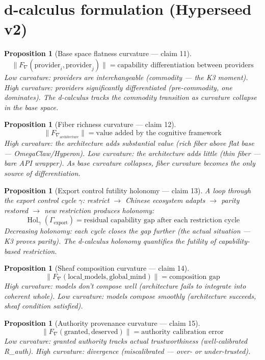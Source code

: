 \documentclass[11pt,a4paper]{article}
\newtheorem{proposition}[definition]{Proposition}
\begin{document}
\section{d-calculus formulation (Hyperseed v2)}

\begin{proposition}[Base space flatness curvature --- claim 11]
\label{prop:base_curv}
\[
  \|F_\nabla(\text{provider}_i, \text{provider}_j)\| =
    \text{capability differentiation between providers}
\]
Low curvature: providers are interchangeable (commodity --- the K3
moment). High curvature: providers significantly differentiated
(pre-commodity, one dominates). The d-calculus tracks the commodity
transition as curvature collapse in the base space.
\end{proposition}

\begin{proposition}[Fiber richness curvature --- claim 12]
\label{prop:fiber_curv}
\[
  \|F_{\nabla_{\text{architecture}}}\| = \text{value added by the
    cognitive framework}
\]
High curvature: the architecture adds substantial value (rich fiber
above flat base --- OmegaClaw/Hyperon). Low curvature: the architecture
adds little (thin fiber --- bare API wrapper). As base curvature
collapses, fiber curvature becomes the only source of differentiation.
\end{proposition}

\begin{proposition}[Export control futility holonomy --- claim 13]
\label{prop:export_hol}
A loop through the export control cycle $\gamma$: restrict $\to$
Chinese ecosystem adapts $\to$ parity restored $\to$ new restriction
produces holonomy:
\[
  \operatorname{Hol}_\gamma(\Gamma_{\text{export}}) = \text{residual
    capability gap after each restriction cycle}
\]
Decreasing holonomy: each cycle closes the gap further (the actual
situation --- K3 proves parity). The d-calculus holonomy quantifies the
futility of capability-based restriction.
\end{proposition}

\begin{proposition}[Sheaf composition curvature --- claim 14]
\label{prop:sheaf_curv}
\[
  \|F_\nabla(\text{local\_models}, \text{global\_mind})\| =
    \text{composition gap}
\]
High curvature: models don't compose well (architecture fails to
integrate into coherent whole). Low curvature: models compose smoothly
(architecture succeeds, sheaf condition satisfied).
\end{proposition}

\begin{proposition}[Authority provenance curvature --- claim 15]
\label{prop:auth_curv}
\[
  \|F_\nabla(\text{granted}, \text{deserved})\| = \text{authority
    calibration error}
\]
Low curvature: granted authority tracks actual trustworthiness
(well-calibrated R\_auth). High curvature: divergence (miscalibrated ---
over- or under-trusted).
\end{proposition}
\end{document}
